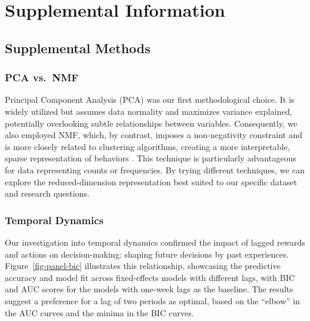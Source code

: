 \documentclass[
  number,
  preprint,
  3p,
  onecolumn]{elsarticle}
\begin{document}
\newpage{}

\section{Supplemental Information}\label{supplemental-information}

\subsection{Supplemental Methods}\label{supplemental-methods}

\subsubsection{PCA vs.~NMF}\label{pca-vs.-nmf}

Principal Component Analysis (PCA) was our first methodological choice.
It is widely utilized but assumes data normality \citep{jolliffe2016}
and maximizes variance explained, potentially overlooking subtle
relationships between variables. Consequently, we also employed NMF,
which, by contrast, imposes a non-negativity constraint and is more
closely related to clustering algorithms, creating a more interpretable,
sparse representation of behaviors \citep{ding2005, lee1999}. This
technique is particularly advantageous for data representing counts or
frequencies. By trying different techniques, we can explore the
reduced-dimension representation best suited to our specific dataset and
research questions.

\subsubsection{Temporal Dynamics}\label{temporal-dynamics}

Our investigation into temporal dynamics confirmed the impact of lagged
rewards and actions on decision-making: shaping future decisions by past
experiences. Figure~\ref{fig-panel-bic} illustrates this relationship,
showcasing the predictive accuracy and model fit across fixed-effects
models with different lags, with BIC and AUC scores for the models with
one-week lags as the baseline. The results suggest a preference for a
lag of two periods as optimal, based on the ``elbow'' in the AUC curves
and the minima in the BIC curves.
\end{document}
